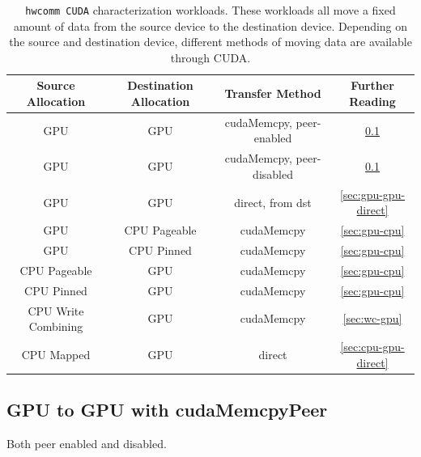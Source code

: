 \begin{table}[]
    \centering
    \caption[\texttt{hwcomm CUDA} characterization workloads]{
        \texttt{hwcomm CUDA} characterization workloads.
        These workloads all move a fixed amount of data from the source device to the destination device.
        Depending on the source and destination device, different methods of moving data are available through CUDA.
    }
    \label{tab:cuda workloads}
    \begin{tabular}{|c|c|c|c|}
    \hline
    \textbf{Source Allocation} & \textbf{Destination Allocation} & \textbf{Transfer Method} & \textbf{Further Reading} \\ \hline 
    GPU                 & GPU          & cudaMemcpy, peer-enabled  & \ref{sec:gpu-gpu-peer} \\ \hline
    GPU                 & GPU          & cudaMemcpy, peer-disabled & \ref{sec:gpu-gpu-peer} \\ \hline
    GPU                 & GPU          & direct, from dst          & \ref{sec:gpu-gpu-direct} \\ \hline
    GPU                 & CPU Pageable & cudaMemcpy                & \ref{sec:gpu-cpu} \\ \hline
    GPU                 & CPU Pinned   & cudaMemcpy                & \ref{sec:gpu-cpu} \\ \hline
    CPU Pageable        & GPU          & cudaMemcpy                & \ref{sec:gpu-cpu} \\ \hline
    CPU Pinned          & GPU          & cudaMemcpy                & \ref{sec:gpu-cpu} \\ \hline
    CPU Write Combining & GPU          & cudaMemcpy                & \ref{sec:wc-gpu} \\ \hline
    CPU Mapped          & GPU          & direct                    & \ref{sec:cpu-gpu-direct} \\ \hline
    \end{tabular}
\end{table}

\subsection{GPU to GPU with cudaMemcpyPeer}
\label{sec:gpu-gpu-peer}

Both peer enabled and disabled.


